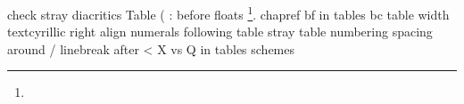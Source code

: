 check stray diacritics
Table (
: before floats
\footnote{}.
chapref
bf in tables
bc table width
textcyrillic
right align numerals
following table
stray table numbering
spacing around /
linebreak after <
X vs Q in tables
schemes
